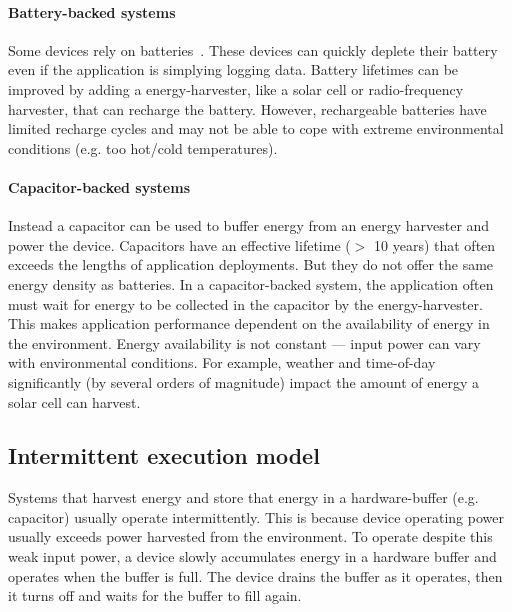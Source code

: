 \paragraph{Battery-backed systems}
Some devices rely on batteries~\cite{culler2002mica,jackson_2019,rowe2011sensor}.
% 
These devices can quickly deplete their battery even if the application is simplying logging data.
% 
Battery lifetimes can be improved by adding a energy-harvester, like a solar cell or radio-frequency harvester, that can recharge the battery.
% 
However, rechargeable batteries have limited recharge cycles and may not be able to cope with extreme environmental conditions (e.g. too hot/cold temperatures).

\paragraph{Capacitor-backed systems}
Instead a capacitor can be used to buffer energy from an energy harvester and power the device.
% 
Capacitors have an effective lifetime ($>$ 10 years) that often exceeds the lengths of application deployments.
% 
But they do not offer the same energy density as batteries.
% 
In a capacitor-backed system, the application often must wait for energy to be collected in the capacitor by the energy-harvester.
% 
This makes application performance dependent on the availability of energy in the environment.
% 
Energy availability is not constant --- input power can vary with environmental conditions.
% 
For example, weather and time-of-day significantly (by several orders of magnitude) impact the amount of energy a solar cell can harvest.

\subsection{Intermittent execution model}
Systems that harvest energy and store that energy in a hardware-buffer (e.g. capacitor) usually operate intermittently.
% 
This is because device operating power usually exceeds power harvested from the environment.
% 
To operate despite this weak input power, a device slowly accumulates energy in a hardware buffer and operates when the buffer is full. 
% 
The device drains the buffer as it operates, then it turns off and waits for the buffer to fill again.
% 

